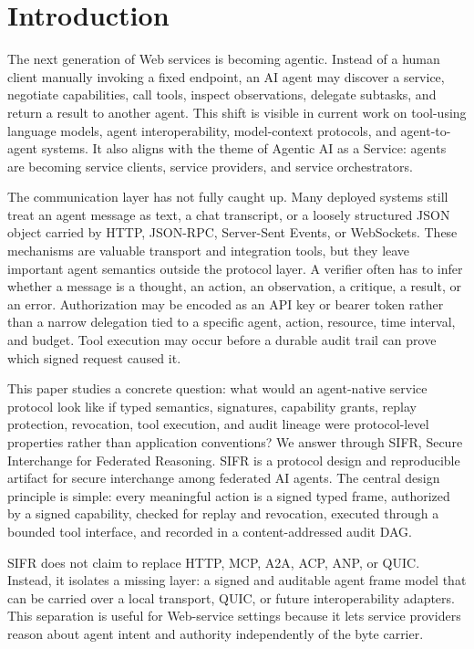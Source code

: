 \documentclass[runningheads]{llncs}
\begin{document}
\section{Introduction}

The next generation of Web services is becoming agentic. Instead of a human client manually invoking a fixed endpoint, an AI agent may discover a service, negotiate capabilities, call tools, inspect observations, delegate subtasks, and return a result to another agent. This shift is visible in current work on tool-using language models, agent interoperability, model-context protocols, and agent-to-agent systems. It also aligns with the theme of Agentic AI as a Service: agents are becoming service clients, service providers, and service orchestrators.

The communication layer has not fully caught up. Many deployed systems still treat an agent message as text, a chat transcript, or a loosely structured JSON object carried by HTTP, JSON-RPC, Server-Sent Events, or WebSockets. These mechanisms are valuable transport and integration tools, but they leave important agent semantics outside the protocol layer. A verifier often has to infer whether a message is a thought, an action, an observation, a critique, a result, or an error. Authorization may be encoded as an API key or bearer token rather than a narrow delegation tied to a specific agent, action, resource, time interval, and budget. Tool execution may occur before a durable audit trail can prove which signed request caused it.

This paper studies a concrete question: what would an agent-native service protocol look like if typed semantics, signatures, capability grants, replay protection, revocation, tool execution, and audit lineage were protocol-level properties rather than application conventions? We answer through SIFR, Secure Interchange for Federated Reasoning. SIFR is a protocol design and reproducible artifact for secure interchange among federated AI agents. The central design principle is simple: every meaningful action is a signed typed frame, authorized by a signed capability, checked for replay and revocation, executed through a bounded tool interface, and recorded in a content-addressed audit DAG.

SIFR does not claim to replace HTTP, MCP, A2A, ACP, ANP, or QUIC. Instead, it isolates a missing layer: a signed and auditable agent frame model that can be carried over a local transport, QUIC, or future interoperability adapters. This separation is useful for Web-service settings because it lets service providers reason about agent intent and authority independently of the byte carrier.
\end{document}
